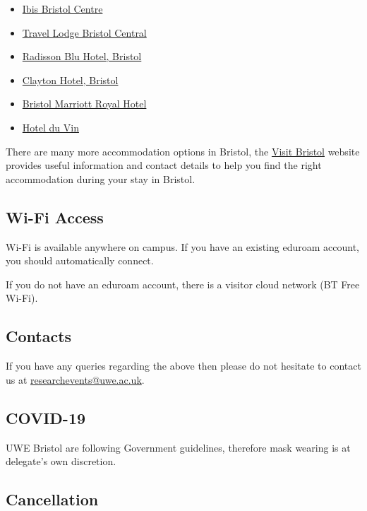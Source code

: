 \documentclass[12pt,a4paper]{article}
\begin{document}
\begin{itemize}
  \item \href{https://all.accor.com/hotel/5547/index.en.shtml}{Ibis Bristol Centre}
  \item \href{https://travelodge.co.uk/hotels/78/Bristol-Central-hotel}{Travel Lodge Bristol Central}
  \item \href{https://www.radissonhotels.com/en-us/hotels/radisson-blu-bristol}{Radisson Blu Hotel, Bristol}
  \item \href{https://www.claytonhotelbristolcity.com/}{Clayton Hotel, Bristol}
  \item \href{https://www.marriott.co.uk/hotels/travel/brsry-bristol-marriott-royal-hotel/}{Bristol Marriott Royal Hotel}
  \item \href{https://www.hotelduvin.com/locations/bristol-city-centre/}{Hotel du Vin}
\end{itemize}

There are many more accommodation options in Bristol, the \href{https://visitbristol.co.uk/accommodation/where-to-stay/central-bristol}{Visit Bristol} website provides useful information and contact details to help you find the right accommodation during your stay in Bristol.

\subsection{Wi-Fi Access}

Wi-Fi is available anywhere on campus. If you have an existing eduroam account, you should automatically connect. 

If you do not have an eduroam account, there is a visitor cloud network (BT Free Wi-Fi).

\subsection{Contacts}

If you have any queries regarding the above then please do not hesitate to contact us at \href{mailto:researchevents@uwe.ac.uk}{researchevents@uwe.ac.uk}.

\subsection{COVID-19}

UWE Bristol are following Government guidelines, therefore mask wearing is at delegate's own discretion.

\subsection{Cancellation}
\end{document}
